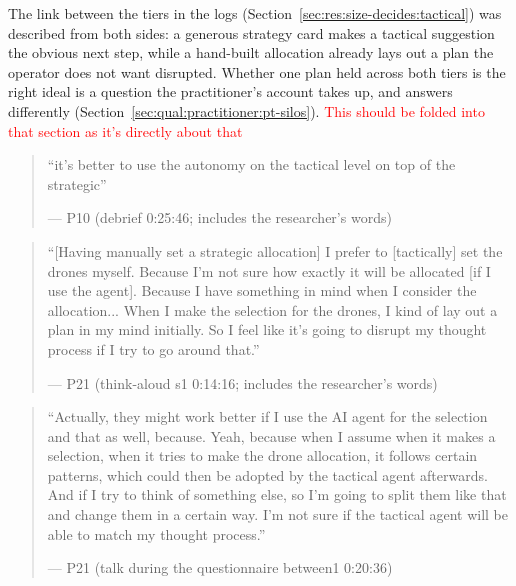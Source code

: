 
\label{sec:qual:hierarchy:one-plan}
The link between the tiers in the logs (Section~\ref{sec:res:size-decides:tactical}) was described from both sides: a generous strategy card makes a tactical suggestion the obvious next step, while a hand-built allocation already lays out a plan the operator does not want disrupted. Whether one plan held across both tiers is the right ideal is a question the practitioner's account takes up, and answers differently (Section~\ref{sec:qual:practitioner:pt-silos}).
\textcolor{red}{This should be folded into that section as it's directly about that}

\begin{quote}\small
``it's better to use the autonomy on the tactical level on top of the strategic''\par\hfill--- P10 (debrief 0:25:46; includes the researcher's words)
\end{quote}

\begin{quote}\small
``[Having manually set a strategic allocation] I prefer to [tactically] set the drones myself. Because I'm not sure how exactly it will be allocated [if I use the agent]. Because I have something in mind when I consider the allocation... When I make the selection for the drones, I kind of lay out a plan in my mind initially. So I feel like it's going to disrupt my thought process if I try to go around that.''\par\hfill--- P21 (think-aloud s1 0:14:16; includes the researcher's words)
\end{quote}

\begin{quote}\small
``Actually, they might work better if I use the AI agent for the selection and that as well, because. Yeah, because when I assume when it makes a selection, when it tries to make the drone allocation, it follows certain patterns, which could then be adopted by the tactical agent afterwards. And if I try to think of something else, so I'm going to split them like that and change them in a certain way. I'm not sure if the tactical agent will be able to match my thought process.''\par\hfill--- P21 (talk during the questionnaire between1 0:20:36)
\end{quote}


